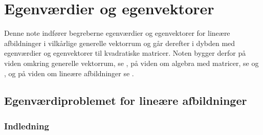 
\setcounter{chapter}{8} %


\chapter{Egenværdier og egenvektorer} \label{tn9}

\begin{basis}
Denne note indfører begreberne egenværdier og egenvektorer for lineære afbildninger i vilkårlige generelle vektorrum og går derefter i dybden med egenværdier og egenvektorer til kvadratiske matricer. Noten bygger derfor på viden omkring generelle vektorrum, se , på viden om algebra med matricer, se  og , og på viden om lineære afbildninger se .
\end{basis}

\section{Egenværdiproblemet for lineære afbildninger}

\subsection{Indledning}

